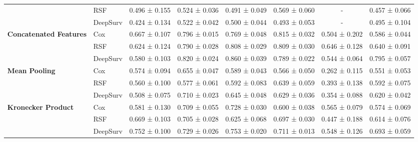 \begin{sidewaystable}[htbp]
\begin{tabular}{@{}llcccccc@{}}
        & RSF & 0.496 ± 0.155 & 0.524 ± 0.036 & 0.491 ± 0.049 & 0.569 ± 0.060 & - & 0.457 ± 0.066 \\
        & DeepSurv & 0.424 ± 0.134 & 0.522 ± 0.042 & 0.500 ± 0.044 & 0.493 ± 0.053 & - & 0.495 ± 0.104 \\
        \midrule
        \multirow{3}{*}{\textbf{Concatenated Features}} & Cox & 0.667 ± 0.107 & 0.796 ± 0.015 & 0.769 ± 0.048 & 0.815 ± 0.032 & 0.504 ± 0.202 & 0.586 ± 0.044 \\
        & RSF & 0.624 ± 0.124 & 0.790 ± 0.028 & 0.808 ± 0.029 & 0.809 ± 0.030 & 0.646 ± 0.128 & 0.640 ± 0.091 \\
        & DeepSurv & 0.580 ± 0.103 & 0.820 ± 0.024 & 0.860 ± 0.039 & 0.789 ± 0.022 & 0.544 ± 0.064 & 0.795 ± 0.057 \\
        \midrule
        \multirow{3}{*}{\textbf{Mean Pooling}} & Cox & 0.574 ± 0.094 & 0.655 ± 0.047 & 0.589 ± 0.043 & 0.566 ± 0.050 & 0.262 ± 0.115 & 0.551 ± 0.053 \\
        & RSF & 0.560 ± 0.100 & 0.577 ± 0.061 & 0.592 ± 0.083 & 0.639 ± 0.059 & 0.393 ± 0.138 & 0.592 ± 0.075 \\
        & DeepSurv & 0.508 ± 0.075 & 0.710 ± 0.023 & 0.645 ± 0.048 & 0.629 ± 0.036 & 0.354 ± 0.088 & 0.620 ± 0.042 \\
        \midrule
        \multirow{3}{*}{\textbf{Kronecker Product}} & Cox & 0.581 ± 0.130 & 0.709 ± 0.055 & 0.728 ± 0.030 & 0.600 ± 0.038 & 0.565 ± 0.079 & 0.574 ± 0.069 \\
        & RSF & 0.669 ± 0.103 & 0.705 ± 0.028 & 0.625 ± 0.068 & 0.697 ± 0.030 & 0.447 ± 0.188 & 0.614 ± 0.076 \\
        & DeepSurv & 0.752 ± 0.100 & 0.729 ± 0.026 & 0.753 ± 0.020 & 0.711 ± 0.013 & 0.548 ± 0.126 & 0.693 ± 0.059 \\
        \bottomrule
    \end{tabular}
\end{sidewaystable}

